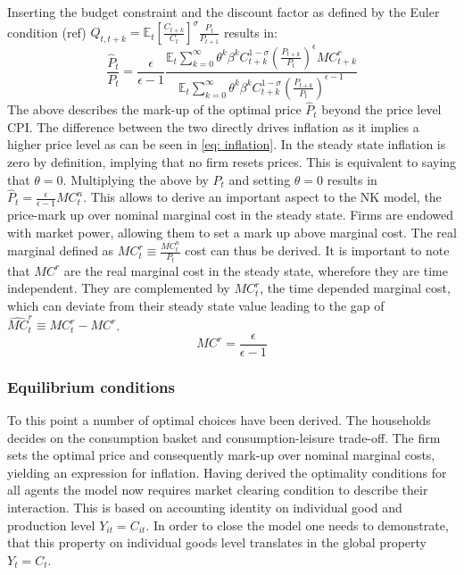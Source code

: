 \documentclass[12pt,a4paper,english]{article} %
\newcommand{\E}{\mathbb{E}} %
\begin{document}
	Inserting the budget constraint and the discount factor as defined by the Euler condition (ref) $Q_{t,t+k} = \E_t \left[ \frac{C_{t+k}}{C_t} \right]^\sigma \frac{P_t}{P_{t+1}}$ results in:
	\begin{equation}
		\frac{\hat{P}_t}{P_t} = \frac{\epsilon}{\epsilon-1} 
		\frac{
		\E_t \sum_{k=0}^{\infty} \theta^k \beta^k C_{t+k}^{1-\sigma} (\frac{P_{t+k}}{P_t})^\epsilon MC_{t+k}^r
		}{
		\E_t \sum_{k=0}^{\infty} \theta^k \beta^k C_{t+k}^{1-\sigma} (\frac{P_{t+k}}{P_t})^{\epsilon-1}
		}
	\end{equation}
	The above describes the mark-up of the optimal price $\hat{P}_t$ beyond the price level CPI. The difference between the two directly drives inflation as it implies a higher price level as can be seen in \ref{eq: inflation}. 
	In the steady state inflation is zero by definition, implying that no firm resets prices. This is equivalent to saying that $\theta=0$. Multiplying the above by $P_t$ and setting $\theta=0$ results in $\hat{P}_t = \frac{\epsilon}{\epsilon-1} MC_t^n$. This allows to derive an important aspect to the NK model, the price-mark up over nominal marginal cost in the steady state. Firms are endowed with market power, allowing them to set a mark up above marginal cost. The real marginal defined as $MC_t^r \equiv \frac{MC_t^n}{P_t}$ cost can thus be derived. It is important to note that $MC^r$ are the real marginal cost in the steady state, wherefore they are time independent. They are complemented by $MC_t^r$, the time depended marginal cost, which can deviate from their steady state value leading to the gap of $\hat{MC}_t^r \equiv MC_t^r - MC^r$.
	\begin{equation}
		MC^r = \frac{\epsilon}{\epsilon-1}
	\end{equation} 
	
	
	\subsubsection{Equilibrium conditions}
	To this point a number of optimal choices have been derived. The households decides on the consumption basket and consumption-leisure trade-off. The firm sets the optimal price and consequently mark-up over nominal marginal costs, yielding an expression for inflation. Having derived the optimality conditions for all agents the model now requires market clearing condition to describe their interaction. This is based on accounting identity on individual good and production level $Y_{it} = C_{it}$. In order to close the model one needs to demonstrate, that this property on individual goods level translates in the global property $Y_t = C_t$.
	
\end{document}
